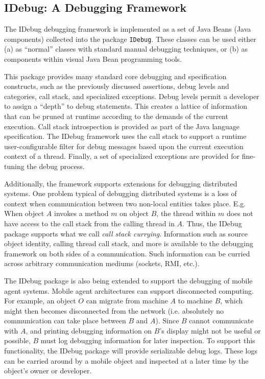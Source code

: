 \documentclass{article}
\begin{document}
\subsection{IDebug: A Debugging Framework}

The IDebug debugging framework is implemented as a set of Java Beans (Java
components) collected into the package \texttt{IDebug}.  These classes can
be used either (a) as ``normal'' classes with standard manual debugging
techniques, or (b) as components within visual Java Bean programming tools.

This package provides many standard core debugging and specification
constructs, such as the previously discussed assertions, debug levels
and categories, call stack, and specialized exceptions.  Debug levels
permit a developer to assign a ``depth'' to debug statements.  This
creates a lattice of information that can be pruned at runtime
according to the demands of the current execution.  Call stack
introspection is provided as part of the Java language specification.
The IDebug framework uses the call stack to support a runtime
user-configurable filter for debug messages based upon the current
execution context of a thread.  Finally, a set of specialized
exceptions are provided for fine-tuning the debug process.

Additionally, the framework supports extensions for debugging
distributed systems.  One problem typical of debugging distributed
systems is a loss of context when communication between two non-local
entities takes place.  E.g. When object $A$ invokes a method $m$ on
object $B$, the thread within $m$ does not have access to the call
stack from the calling thread in $A$.  Thus, the IDebug package
supports what we call \emph{call stack currying}.  Information such as
source object identity, calling thread call stack, and more is
available to the debugging framework on both sides of a communication.
Such information can be curried across arbitrary communication mediums
(sockets, RMI, etc.).

The IDebug package is also being extended to support the debugging of
mobile agent systems.  Mobile agent architectures can support
disconnected computing.  For example, an object $O$ can migrate from
machine $A$ to machine $B$, which might then becomes disconnected from
the network (i.e.  absolutely no communication can take place between
$B$ and $A$).  Since $B$ cannot communicate with $A$, and printing
debugging information on $B$'s display might not be useful or
possible, $B$ must log debugging information for later inspection.  To
support this functionality, the IDebug package will provide
serializable debug logs.  These logs can be carried around by a mobile
object and inspected at a later time by the object's owner or
developer.
\end{document}
